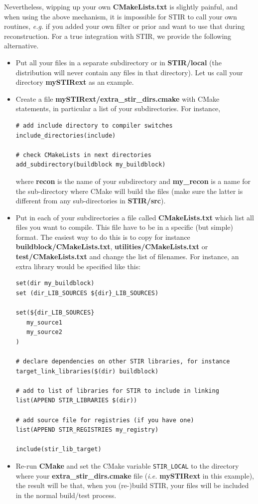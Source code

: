 \documentclass{article}
\begin{document}
Nevertheless, wipping up your own \textbf{CMakeLists.txt} is slightly painful, and when using the
above mechanism, it is impossible for STIR to call your own routines, \textit{e.g.} if you
added your own filter or prior and want to use that during reconstruction.
For a true integration with  STIR, we provide the following alternative.

\begin{itemize}
\item Put all your files in a separate subdirectory or in \textbf{STIR/local} (the distribution 
will never contain any files in that directory). Let us call your directory 
\textbf{mySTIRext} as an example.
\item Create a file \textbf{mySTIRext/extra\_stir\_dirs.cmake} with CMake statements,
in particular a list of your subdirectories. For instance,
\begin{verbatim}
# add include directory to compiler switches
include_directories(include)

# check CMakeLists in next directories
add_subdirectory(buildblock my_buildblock)
\end{verbatim}
where \textbf{recon} is the name of your subdirectory and \textbf{my\_recon} is a name for the
sub-directory where CMake will build the files (make sure the latter is different from any
sub-directories in \textbf{STIR/src}).

\item Put in each of your subdirectories a file called \textbf{CMakeLists.txt}
which list all files you want to compile. This file have to 
be in a specific (but simple) format. The easiest way to do this 
is to copy for instance \textbf{buildblock/CMakeLists.txt}, \textbf{utilities/CMakeLists.txt}
or  \textbf{test/CMakeLists.txt} and change the list of filenames. For instance, an extra library
would be specified like this:
\begin{verbatim}
set(dir my_buildblock)
set (dir_LIB_SOURCES ${dir}_LIB_SOURCES)

set(${dir_LIB_SOURCES}
   my_source1
   my_source2
)

# declare dependencies on other STIR libraries, for instance
target_link_libraries($(dir) buildblock)

# add to list of libraries for STIR to include in linking
list(APPEND STIR_LIBRARIES $(dir))

# add source file for registries (if you have one)
list(APPEND STIR_REGISTRIES my_registry)

include(stir_lib_target)
\end{verbatim}

\item Re-run \textbf{CMake} and set the CMake variable \texttt{STIR\_LOCAL} to the directory where your
\textbf{extra\_stir\_dirs.cmake} file (\textit{i.e.} \textbf{mySTIRext} in this example),
the result will be that, when you (re-)build STIR, your files will be included in 
the normal build/test process.
\end{itemize}
\end{document}
